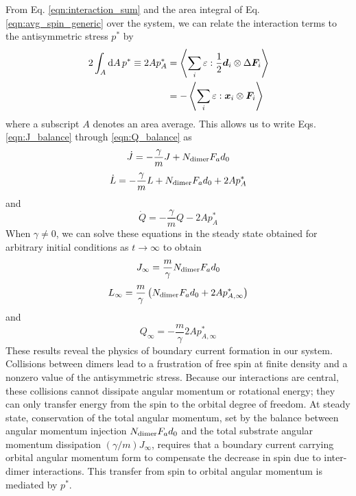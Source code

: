 \documentclass[%
 reprint,
superscriptaddress,
longbibliography,
 amsmath,amssymb,
 prl,
 citeautoscript,
]{revtex4-1}
\begin{document}
From Eq. \ref{eqn:interaction_sum} and the area integral of Eq. \ref{eqn:avg_spin_generic} over the system, we can relate the interaction terms to the antisymmetric stress $p^*$ by
\begin{equation}
\begin{split}
2 \int_A {\rm d}A \, p^* \equiv 2 A p_A^* &= \left\langle \sum_i \varepsilon : \frac{1}{2} {\boldsymbol d}_i \otimes \Delta {\boldsymbol F}_i \right\rangle \\
&= - \left\langle \sum_i \varepsilon : {\boldsymbol x}_i \otimes {\boldsymbol F}_i \right\rangle
\end{split}
\label{eqn:Tint}
\end{equation}
where a subscript $A$ denotes an area average. This allows us to write Eqs. \ref{eqn:J_balance} through \ref{eqn:Q_balance} as
\begin{equation}
\dot{J} = - \frac{\gamma}{m} J + N_{\rm dimer} F_a d_0
\label{eqn:J_dimer_2}
\end{equation}
\begin{equation}
\dot{L} = - \frac{\gamma}{m} L + N_{\rm dimer} F_a d_0 + 2 A p_A^*
\label{eqn:L_dimer_2}
\end{equation}
and
\begin{equation}
\dot{Q} = - \frac{\gamma}{m} Q - 2 A p_A^*
\label{eqn:Q_dimer_2}
\end{equation}
When $\gamma \neq 0$, we can solve these equations in the steady state obtained for arbitrary initial conditions as $t \rightarrow \infty$ to obtain
\begin{equation}
J_{\infty} = \frac{m}{\gamma} N_{\rm dimer} F_a d_0
\label{eqn:J_steadystate_dimer}
\end{equation}
\begin{equation}
L_{\infty} = \frac{m}{\gamma} \left( N_{\rm dimer} F_a d_0 + 2 A p_{A,\infty}^* \right)
\label{eqn:L_steadystate_dimer}
\end{equation}
and
\begin{equation}
Q_{\infty} = - \frac{m}{\gamma} 2 A p_{A,\infty}^*
\label{eqn:Q_steadystate_dimer}
\end{equation}
These results reveal the physics of boundary current formation in our system. Collisions between dimers lead to a frustration of free spin at finite density and a nonzero value of the antisymmetric stress. Because our interactions are central, these collisions cannot dissipate angular momentum or rotational energy; they can only transfer energy from the spin to the orbital degree of freedom. At steady state, conservation of the total angular momentum, set by the balance between angular momentum injection $N_{\rm dimer} F_a d_0$ and the total substrate angular momentum dissipation $(\gamma/m) J_{\infty}$, requires that a boundary current carrying orbital angular momentum form to compensate the decrease in spin due to inter-dimer interactions. This transfer from spin to orbital angular momentum is mediated by $p^*$.
\end{document}
